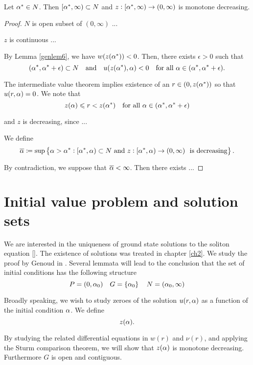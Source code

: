 \begin{lemma}\label{genlem8}
Let $\alpha^{*} \in N$. Then $\left[ \alpha^{*}, \infty \right) \subset N$ and $z : \left[
\alpha^{*}, \infty \right) \to (0, \infty)$ is monotone decreasing.
\end{lemma}
\begin{proof}
$N$ is open subset of $(0, \infty)$ ...

$z$ is continuous ...

By Lemma \ref{genlem6}, we have $w(z(\alpha^{*})) < 0$. Then, there exists $\epsilon >
0$ such that
\[ (\alpha^{*}, \alpha^{*} + \epsilon) \subset N\quad\text{and}\quad u(z(\alpha^{*}), \alpha) < 0\quad
\text{for all} ~ \alpha \in (\alpha^{*}, \alpha^{*} + \epsilon). \]

The intermediate value theorem implies existence of an $r \in (0, z(\alpha^{*}))$ so
that $u(r, \alpha) = 0$. We note that 
\[ z(\alpha) \leqslant r < z(\alpha^{*})\quad\text{for all} ~ \alpha \in (\alpha^{*}, \alpha^{*} + \epsilon) \]

and $z$ is decreasing, since ...

We define
\[ \overline{\alpha} \coloneqq \sup \left\{ \alpha > \alpha^{*} : \left[ \alpha^{*}, \alpha \right) \subset N ~
\text{and} ~ z : \left[ \alpha^{*}, \alpha \right) \to (0, \infty) ~ \text{ is decreasing}
\right\}. \]


By contradiction, we suppose that $\overline{\alpha} < \infty$. Then there exists ...

\end{proof}

\section{Initial value problem and solution sets}
We are interested in the uniqueness of ground state solutions to the soliton
equation \eqref{}. The existence of solutions was treated in chapter \ref{ch2}.
We study the proof by Genoud in \cite{gen11}. Several lemmata will lead to the
conclusion that the set of initial conditions has the following structure
\[ P=(0,\alpha_0)\quad G=\left\{\alpha_0\right\}\quad N=(\alpha_0,\infty) \]

Broadly speaking, we wish to study zeroes of the solution $u(r,\alpha)$ as a
function of the initial condition $\alpha$. {\red We define}
\[ z(\alpha). \]

By studying the related differential equations in $w(r)$ and $\nu(r)$, and
applying the Sturm comparison theorem, we will show that $z(\alpha)$ is
monotone decreasing. Furthermore {\red $G$ is open and contiguous}.

